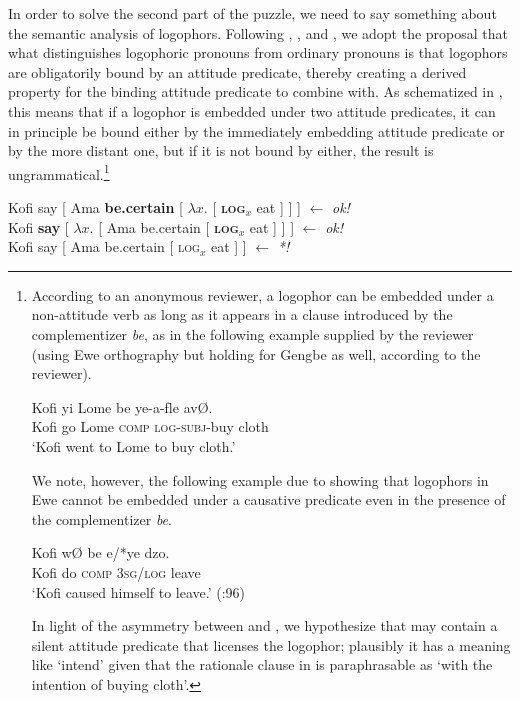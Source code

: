 \documentclass[output=paper,modfonts,nonflat]{langsci/langscibook}
\begin{document}
\largerpage[-2] In order to solve the second part of the puzzle, we need to say something about the semantic analysis of logophors. Following \cite{Heim2002}, \cite{Stechow2009, Stechow2003}, and \cite{Pearson2015}, we adopt the proposal that what distinguishes logophoric pronouns from ordinary pronouns is that logophors are obligatorily bound by an attitude predicate, thereby creating a derived property for the binding attitude predicate to combine with. As schematized in , this means that  if a logophor is embedded under two attitude predicates, it can in principle be bound either by the immediately embedding attitude predicate or by the more distant one, but if it is not bound by either, the result is ungrammatical.\footnote{According to an anonymous reviewer, a logophor can be embedded under a non-attitude verb as long as it appears in a clause introduced by the complementizer \emph{be}, as in the following example supplied by the reviewer (using Ewe orthography but holding for Gengbe as well, according to the reviewer).


\ea \label{ex:grano:reviewerLogophor:28}
\gll Kofi yi Lome be ye-a-ƒle av{\O}.\\
Kofi go Lome \textsc{comp} \textsc{log}-\textsc{subj}-buy cloth\\
\glt `Kofi went to Lome to buy cloth.'
\z

We note, however, the following example due to \cite{Pearson2015} showing that logophors in Ewe cannot be embedded under a causative predicate even in the presence of the complementizer \emph{be}. 

\ea \label{ex:grano:complementizerBe:29}
\gll Kofi w{\O} be e/*ye dzo.\\
Kofi do \textsc{comp} 3\textsc{sg}/\textsc{log} leave\\
\glt `Kofi caused himself to leave.' (\citealt{Pearson2015}:96)
\z

In light of the asymmetry between  and , we hypothesize that  may contain a silent attitude predicate that licenses the logophor; plausibly it has a meaning like `intend' given that the rationale clause in  is paraphrasable as `with the intention of buying cloth'.

}


\ea  \label{ex:grano:log:30}
    \begin{xlist}
    \ex Kofi say [ Ama \textbf{be.certain} [ $\lambda x$. [ \textbf{\textsc{log}}$_{x}$ eat ] ] ] \hfill $\leftarrow$ \emph{ok!}\\
    \ex Kofi \textbf{say} [ $\lambda x$. [ Ama be.certain  [ \textbf{\textsc{log}}$_{x}$ eat ] ] ] \hfill $\leftarrow$ \emph{ok!} \\
    \ex Kofi say  [ Ama be.certain  [ \textsc{log}$_{x}$ eat ] ] \hfill $\leftarrow$ \emph{*!}
    \end{xlist}
\z
\end{document}
